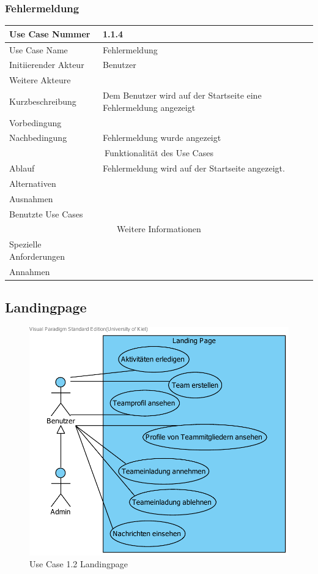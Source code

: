 \documentclass[10pt,a4paper]{article}
\begin{document}
\subsubsection{Fehlermeldung} %
	\begin{tabularx}{\textwidth}{|l|X|}
	\hline Use Case Nummer & 1.1.4 \\ 
	\hline Use Case Name & Fehlermeldung \\ 
	\hline Initiierender Akteur & Benutzer \\
	\hline Weitere Akteure &  \\
	\hline Kurzbeschreibung & Dem Benutzer wird auf der Startseite eine Fehlermeldung angezeigt \\
	\hline Vorbedingung &  \\
	\hline Nachbedingung & Fehlermeldung wurde angezeigt \\
	\hline \multicolumn{2}{|c|}{Funktionalität des Use Cases}\\
	\hline Ablauf & Fehlermeldung wird auf der Startseite angezeigt. \\
	\hline Alternativen &  \\
	\hline Ausnahmen &  \\
	\hline Benutzte Use Cases &  \\
	\hline \multicolumn{2}{|c|}{Weitere Informationen} \\
	\hline Spezielle Anforderungen &  \\
	\hline Annahmen &  \\
	\hline
	\end{tabularx}
                
\subsection{Landingpage}

		\begin{figure}[H]
	\centering
			\includegraphics[width=\linewidth]{gfx/webseite/LandingPage.pdf}
			\caption{Use Case 1.2 Landingpage}
		\end{figure}
\end{document}
